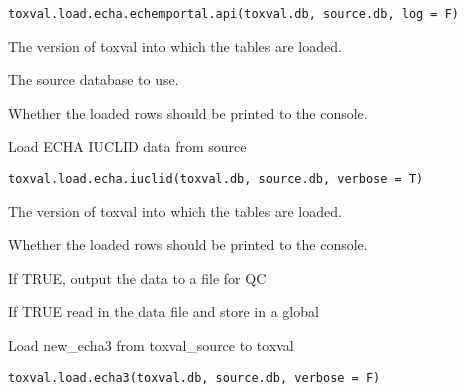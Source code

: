 \documentclass[letterpaper]{book}
\begin{document}
%
\begin{Usage}
\begin{verbatim}
toxval.load.echa.echemportal.api(toxval.db, source.db, log = F)
\end{verbatim}
\end{Usage}
%
\begin{Arguments}
\begin{ldescription}
\item[\code{toxval.db}] The version of toxval into which the tables are loaded.

\item[\code{source.db}] The source database to use.

\item[\code{verbose}] Whether the loaded rows should be printed to the console.
\end{ldescription}
\end{Arguments}
%
\begin{Description}\relax
Load ECHA IUCLID data from source
\end{Description}
%
\begin{Usage}
\begin{verbatim}
toxval.load.echa.iuclid(toxval.db, source.db, verbose = T)
\end{verbatim}
\end{Usage}
%
\begin{Arguments}
\begin{ldescription}
\item[\code{toxval.db}] The version of toxval into which the tables are loaded.

\item[\code{verbose}] Whether the loaded rows should be printed to the console.

\item[\code{to.file}] If TRUE, output the data to a file for QC

\item[\code{do.read}] If TRUE read in the data file and store in a global
\end{ldescription}
\end{Arguments}
%
\begin{Description}\relax
Load new\_echa3 from toxval\_source to toxval
\end{Description}
%
\begin{Usage}
\begin{verbatim}
toxval.load.echa3(toxval.db, source.db, verbose = F)
\end{verbatim}
\end{Usage}
\end{document}
